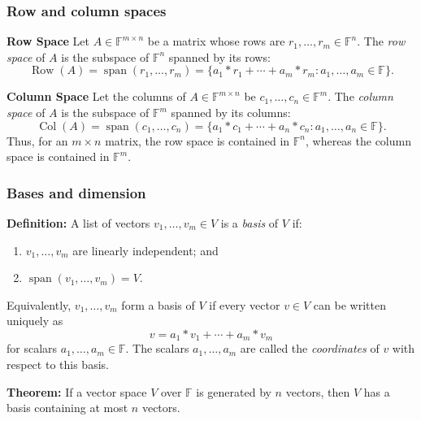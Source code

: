\documentclass[a4paper,11pt,abstract=true]{scrartcl}
\theoremstyle{dotlessP}
\theoremstyle{dotlessS}
\theoremstyle{remark}
\theoremstyle{definition}
\begin{document}
\subsubsection{Row and column spaces}
\textbf{Row Space} Let $A\in \mathbb{F}^{m\times n}$ be a matrix whose
rows are $r_1,\ldots,r_m\in \mathbb{F}^n$. The \emph{row space} of $A$ is the subspace
of $\mathbb{F}^n$ spanned by its rows:
\[
\operatorname{Row}(A)
=\operatorname{span}(r_1,\ldots,r_m)
=\{a_1*r_1+\cdots+a_m*r_m:a_1,\ldots,a_m\in \mathbb{F}\}.
\]

\textbf{Column Space} Let the columns of
$A\in \mathbb{F}^{m\times n}$ be $c_1,\ldots,c_n\in \mathbb{F}^m$. The \emph{column space} of
$A$ is the subspace of $\mathbb{F}^m$ spanned by its columns:
\[
\operatorname{Col}(A)
=\operatorname{span}(c_1,\ldots,c_n)
=\{a_1*c_1+\cdots+a_n*c_n:a_1,\ldots,a_n\in \mathbb{F}\}.
\]
Thus, for an $m\times n$ matrix, the row space is contained in $\mathbb{F}^n$, whereas
the column space is contained in $\mathbb{F}^m$.

\subsubsection{Bases and dimension}
\begin{definition_box}
\textbf{Definition:} A list of vectors
$v_1,\ldots,v_m\in V$ is a \emph{basis} of $V$ if:
\begin{enumerate}
    \item $v_1,\ldots,v_m$ are linearly independent; and
    \item $\operatorname{span}(v_1,\ldots,v_m)=V$.
\end{enumerate}
Equivalently, $v_1,\ldots,v_m$ form a basis of $V$ if every vector $v\in V$
can be written uniquely as
\[
v=a_1*v_1+\cdots+a_m*v_m
\]
for scalars $a_1,\ldots,a_m\in \mathbb{F}$. The scalars $a_1,\ldots,a_m$ are called
the \emph{coordinates} of $v$ with respect to this basis.
\end{definition_box}

\begin{problem_box}
\textbf{Theorem:} If a vector space $V$ over $\mathbb{F}$ is generated by $n$
vectors, then $V$ has a basis containing at most $n$ vectors.

\end{problem_box}
\end{document}
